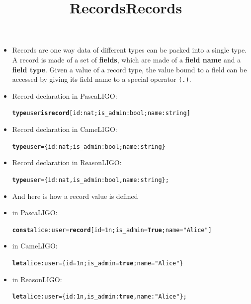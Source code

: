 \documentclass[wide]{slides}
\newcommand{\Kconst}[0]{\textbf{const}\xspace}
\newcommand{\Kis}[0]{\textbf{is}\xspace}
\newcommand{\Krecord}[0]{\textbf{record}\xspace}
\newcommand{\KTrue}[0]{\textbf{True}\xspace}
\newcommand{\Ktype}[0]{\textbf{type}\xspace}
\newcommand{\Klet}[0]{\textbf{let}\xspace}
\newcommand{\Ktrue}[0]{\textbf{true}\xspace}
\begin{document}
\begin{slide}
  \title{Records}

  \begin{itemize}

    \item Records are one way data of different types can be packed
      into a single type. A record is made of a set of
      \textbf{fields}, which are made of a \textbf{field name} and a
      \textbf{field type}. Given a value of a record type, the value
      bound to a field can be accessed by giving its field name to a
      special operator \texttt{(.)}.

    \item Record declaration in PascaLIGO:
      \begin{alltt}
\Ktype user \Kis \Krecord [id : nat; is_admin : bool; name : string]
      \end{alltt}

    \item Record declaration in CameLIGO:
      \begin{alltt}
\Ktype user = \{id : nat; is_admin : bool; name : string\}
      \end{alltt}

    \item Record declaration in ReasonLIGO:
      \begin{alltt}
\Ktype user = \{id : nat, is_admin : bool, name : string\};
      \end{alltt}

  \end{itemize}

\end{slide}

\begin{slide}
  \title{Records}

  \begin{itemize}

    \item And here is how a record value is defined

    \item in PascaLIGO:
      \begin{alltt}
\Kconst alice : user = \Krecord [id=1n; is_admin = \KTrue; name = "Alice"]
      \end{alltt}

    \item in CameLIGO:
      \begin{alltt}
\Klet alice : user = \{id = 1n; is_admin = \Ktrue; name = "Alice"\}
      \end{alltt}

    \item in ReasonLIGO:
      \begin{alltt}
\Klet alice : user = \{id : 1n, is_admin : \Ktrue, name : "Alice"\};
      \end{alltt}
  \end{itemize}

\end{slide}
\end{document}
